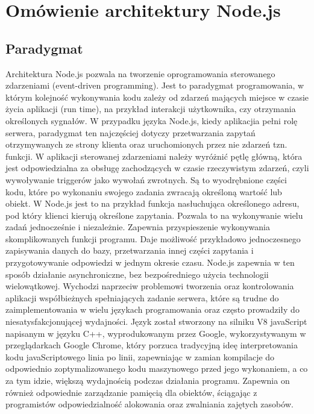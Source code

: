 \documentclass[12pt]{report}
\begin{document}
\chapter{Omówienie architektury Node.js}

\section{Paradygmat}
Architektura Node.js pozwala na tworzenie oprogramowania sterowanego zdarzeniami (event-driven programming). 
Jest to paradygmat programowania, w którym kolejność wykonywania kodu zależy od zdarzeń mających miejsce w czasie życia aplikacji (run time), na przykład interakcji użytkownika, czy otrzymania określonych sygnałów. 
W przypadku języka Node.js, kiedy aplikacjia pełni rolę serwera, paradygmat ten najczęściej dotyczy przetwarzania zapytań otrzymywanych ze strony klienta oraz uruchomionych przez nie zdarzeń tzn. funkcji. 
W aplikacji sterowanej zdarzeniami należy wyróżnić pętlę główną, która jest odpowiedzialna za obsługę zachodzących w czasie rzeczywistym zdarzeń, czyli wywoływanie triggerów jako wywołań zwrotnych. 
Są to wyodrębnione części kodu, które po wykonaniu swojego zadania zwracają określoną wartość lub obiekt. 
W Node.js jest to na przykład funkcja nasłuchująca określonego adresu, pod który klienci kierują określone zapytania. 
Pozwala to na wykonywanie wielu zadań jednocześnie i niezależnie. 
Zapewnia przyspieszenie wykonywania skomplikowanych funkcji programu. 
Daje możliwość przykładowo jednoczesnego zapisywania danych do bazy, przetwarzania innej części zapytania i przygotowywanie odpowiedzi w jednym okresie czasu. 
Node.js zapewnia w ten sposób działanie asynchroniczne, bez bezpośredniego użycia technologii wielowątkowej. 
Wychodzi naprzeciw problemowi tworzenia oraz kontrolowania aplikacji współbieżnych spełniających zadanie serwera, które są trudne do zaimplementowania w wielu językach programowania oraz często prowadziły do niesatysfakcjonującej wydajności. 
Język został stworzony na silniku V8 javaScript napisanym w języku C++, wyprodukowanym przez Google, wykorzystywanym w przeglądarkach Google Chrome, który porzuca tradycyjną ideę interpretowania kodu javaScriptowego linia po linii, zapewniając w zamian kompilacje do odpowiednio zoptymalizowanego kodu maszynowego przed jego wykonaniem, a co za tym idzie, większą wydajnością podczas działania programu. 
Zapewnia on również odpowiednie zarządzanie pamięcią dla obiektów, ściągając z programistów odpowiedzialność alokowania oraz zwalniania zajętych zasobów.
\end{document}
